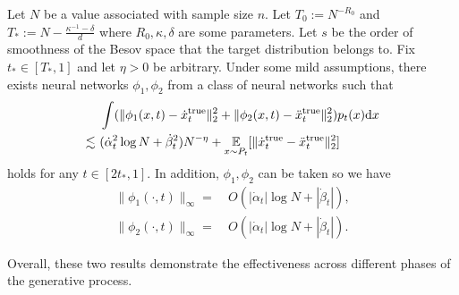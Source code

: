 \begin{theorem}\label{thm:secon_order_large_t:informal}
    Let $N$ be a value associated with sample size $n$. Let $T_0 := N^{-R_0}$ and $T_* := N - \frac{\kappa^{-1} - \delta}{d}$ where $R_0, \kappa, \delta$ are some parameters.  Let $s$ be the order of smoothness of the Besov space that the target distribution belongs to.
    Fix $t_{*} \in [T_{*},1]$ and let $\eta>0$ be arbitrary. Under some mild assumptions, there exists neural networks $\phi_{1},\phi_2$ from a class of neural networks such that
\begin{align*}
    &~ \int (\|\phi_1(x, t) - \dot{x}_t^\mathrm{true}\|_2^2 + \|\phi_2(x, t) - \ddot{x}_t^\mathrm{true}\|_2^2) p_t(x) \mathrm{d} x \\ \lesssim &~ (\dot{\alpha}_t^{2} \log N  +   \dot{\beta}_t^{2} ) N^{-\eta} +
    \operatorname*{{\mathbb{E}}}_{x \sim P_t}[\|\dot{x}^\mathrm{true}_t - \ddot{x}^\mathrm{true}_t\|_2^2]
\end{align*}
    holds for any $t \in [2t_*, 1]$. In addition, $\phi_1, \phi_2$ can be taken so we have
    \begin{align*}
         \|\phi_1(\cdot,t) \|_\infty = &~ O(  |\dot{\alpha}_t | \log N +  |\dot{\beta}_t |), \\ \|\phi_2(\cdot,t) \|_\infty = &~ O(  |\dot{\alpha}_t | \log N +  |\dot{\beta}_t |).
    \end{align*}
\end{theorem}

Overall, these two results demonstrate the effectiveness across different phases of the generative process.
